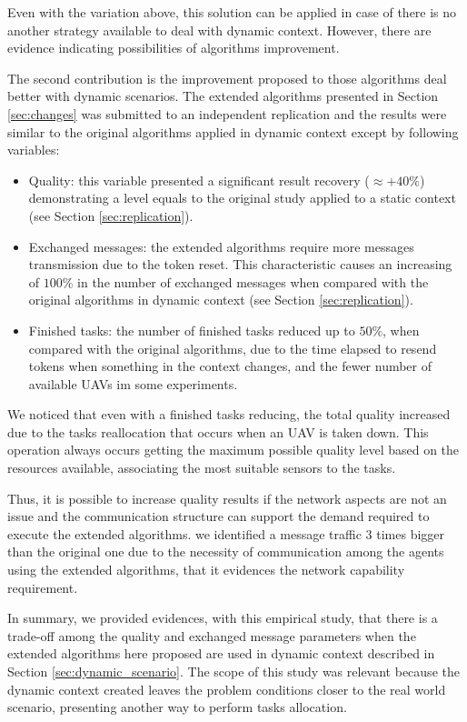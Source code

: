Even with the variation above, this solution can be applied in case of there is no another strategy available to deal with dynamic context. However, there are evidence indicating possibilities of algorithms improvement.

The second contribution is the improvement proposed to those algorithms deal better with dynamic scenarios. The extended algorithms presented in Section \ref{sec:changes} was submitted to an independent replication and the results were similar to the original algorithms applied in dynamic context except by following variables:

\begin{itemize}
   \item Quality: this variable presented a significant result recovery ($\approx +40\%$) demonstrating a level equals to the original study applied to a static context (see Section \ref{sec:replication}).
   \item Exchanged messages: the extended algorithms require more messages transmission due to the token reset. This characteristic causes an increasing of $100\%$ in the number of exchanged messages when compared with the original algorithms in dynamic context (see Section \ref{sec:replication}).
   \item Finished tasks: the number of finished tasks reduced up to $50\%$, when compared with the original algorithms, due to the time elapsed to resend tokens when something in the context changes, and the fewer number of available UAVs im some experiments.
\end{itemize}

We noticed that even with a finished tasks reducing, the total quality increased due to the tasks reallocation that occurs when an UAV is taken down. This operation always occurs getting the maximum possible quality level based on the resources available, associating the most suitable sensors to the tasks.

Thus, it is possible to increase quality results if the network aspects are not an issue and the communication structure can support the demand required to execute the extended algorithms. we identified a message traffic 3 times bigger than the original one due to the necessity of communication among the agents using the extended algorithms, that it evidences the network capability requirement.

In summary, we provided evidences, with this empirical study, that there is a trade-off among the quality and exchanged message parameters when the extended algorithms here proposed are used in dynamic context described in Section \ref{sec:dynamic_scenario}. The scope of this study was relevant because the dynamic context created leaves the problem conditions closer to the real world scenario, presenting another way to perform tasks allocation.